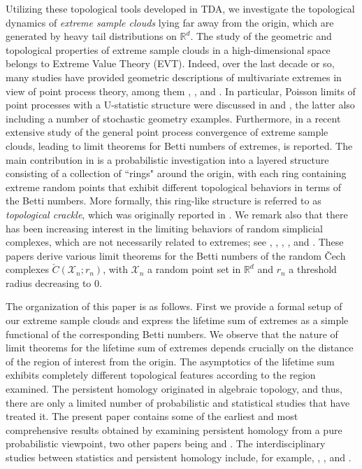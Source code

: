 \documentclass[11pt]{amsart}
\numberwithin{equation}{section}
\theoremstyle{plain}
\theoremstyle{definition}
\begin{document}
Utilizing these topological tools developed in TDA, we investigate the topological dynamics of \textit{extreme sample clouds} lying far away from the origin, which are generated by heavy tail distributions on ${{\mathbb R}}^d$. The study of the geometric and topological properties of extreme sample clouds in a high-dimensional space belongs to Extreme Value Theory (EVT). Indeed, over the last decade or so, many studies have provided geometric descriptions of multivariate extremes in view of point process theory, among them \cite{balkema:embrechts:2007}, \cite{balkema:embrechts:nolde:2010}, and \cite{balkema:embrechts:nolde:2013}.  In particular, Poisson limits of point processes with a U-statistic structure were discussed in \cite{dabrowski:dehling:mikosch:sharipov:2002} and \cite{schulte:thale:2012}, the latter also including a number of stochastic geometry examples. Furthermore, in \cite{owada:adler:2016} a recent extensive study of the general point process convergence of extreme sample clouds, leading to limit theorems for Betti numbers of extremes, is reported. The main contribution in \cite{owada:adler:2016} is a probabilistic investigation into a
 layered structure consisting of a collection of ``rings" around the origin, with each ring containing extreme random points that exhibit different topological behaviors in terms of the Betti numbers. More formally, this ring-like structure is referred to as \textit{topological crackle}, which was originally reported in \cite{adler:bobrowski:weinberger:2014}. We remark also that there has been increasing interest in the limiting behaviors of random simplicial complexes, which are not necessarily related to extremes; see \cite{kahle:2011}, \cite{kahle:meckes:2013}, \cite{yogeshwaran:adler:2015},    \cite{yogeshwaran:subag:adler:2014}, and \cite{bobrowski:mukherjee:2015}. These papers derive various limit theorems for the Betti numbers of the random \v{C}ech complexes $\check{C}(\mathcal X_n; r_n)$, with $\mathcal X_n$ a random point set in ${{\mathbb R}}^d$ and $r_n$ a threshold radius decreasing to $0$.

The organization of this paper is as follows. First we provide a formal setup of our extreme sample clouds and express the lifetime sum of extremes as a simple functional of the corresponding Betti numbers. We observe that the nature of limit theorems for the lifetime sum of extremes depends crucially on the distance of the region of interest from the origin. The asymptotics of the lifetime sum exhibits completely different topological features according to the region examined.
The persistent homology originated in algebraic topology, and thus, there are only a limited number of probabilistic and statistical studies that have treated it. The present paper contains some of the earliest and
most comprehensive results obtained by examining persistent homology from a pure probabilistic viewpoint, two other papers being \cite{hiraoka:shirai:2015} and \cite{bobrowski:kahle:skraba:2015}. The interdisciplinary studies between statistics and persistent homology include, for example, \cite{fasy:lecci:rinaldo:wasserman:balakrishnan:singh:2014}, \cite{bubenik:2015}, and \cite{kusano:fukumizu:hiraoka:2016}. 
\end{document}
